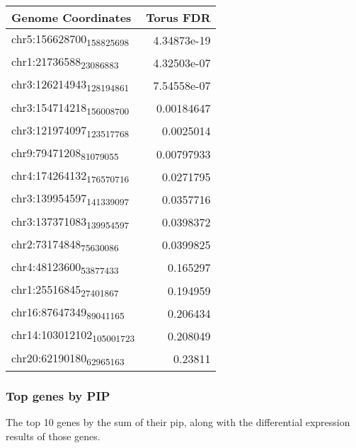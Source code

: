 \begin{center}
\begin{tabular}{lr}
Genome Coordinates & Torus FDR\\
\hline
chr5:156628700\textsubscript{158825698} & 4.34873e-19\\
chr1:21736588\textsubscript{23086883} & 4.32503e-07\\
chr3:126214943\textsubscript{128194861} & 7.54558e-07\\
chr3:154714218\textsubscript{156008700} & 0.00184647\\
chr3:121974097\textsubscript{123517768} & 0.0025014\\
chr9:79471208\textsubscript{81079055} & 0.00797933\\
chr4:174264132\textsubscript{176570716} & 0.0271795\\
chr3:139954597\textsubscript{141339097} & 0.0357716\\
chr3:137371083\textsubscript{139954597} & 0.0398372\\
chr2:73174848\textsubscript{75630086} & 0.0399825\\
chr4:48123600\textsubscript{53877433} & 0.165297\\
chr1:25516845\textsubscript{27401867} & 0.194959\\
chr16:87647349\textsubscript{89041165} & 0.206434\\
chr14:103012102\textsubscript{105001723} & 0.208049\\
chr20:62190180\textsubscript{62965163} & 0.23811\\
\end{tabular}
\end{center}




\subsubsection*{Top genes by PIP}
\label{sec:org28d8484}

The top 10 genes by the sum of their pip, along with the differential expression results of those genes.


